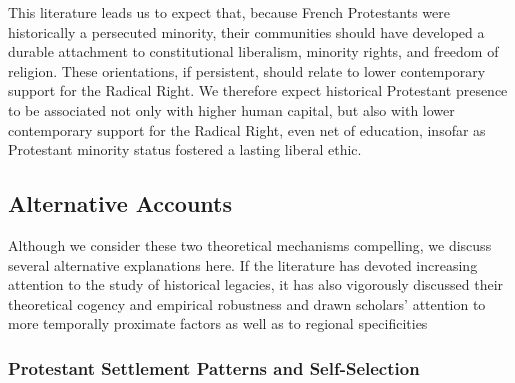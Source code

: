 \documentclass[12pt]{article}
\begin{document}
This literature leads us to expect that, because French Protestants were historically a persecuted minority, their communities should have developed a durable attachment to constitutional liberalism, minority rights, and freedom of religion. These orientations, if persistent, should relate to lower contemporary support for the Radical Right. We therefore expect historical Protestant presence to be associated not only with higher human capital, but also with lower contemporary support for the Radical Right, even net of education, insofar as Protestant minority status fostered a lasting liberal ethic.

\subsection{Alternative Accounts}

Although we consider these two theoretical mechanisms compelling, we discuss several alternative explanations here. If the literature has devoted increasing attention to the study of historical legacies, it has also vigorously discussed their theoretical cogency and empirical robustness \parencite{abadHistoryNeverReally2021} and drawn scholars' attention to more temporally proximate factors as well as to regional specificities \parencite{arzheimerOppressionCatholicsPrussia2024, manowErbeKulturkampfsOder2023, edwardsDidProtestantismPromote2021,pepinskyModelingSpatialHeterogeneity2024}

\subsubsection{Protestant Settlement Patterns and Self-Selection}
\end{document}
